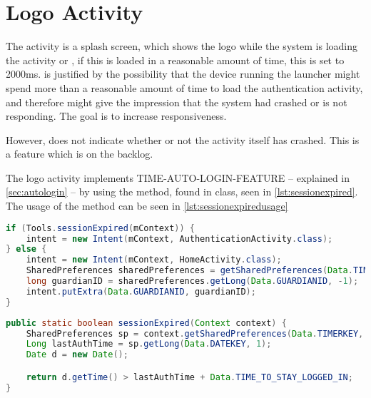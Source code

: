 \section{Logo Activity}
The  activity is a splash screen, which shows the \giraf[] logo while the system is loading the activity  or , if this is loaded in a reasonable amount of time, this is set to 2000ms.  is justified by the possibility that the device running the launcher might spend more than a reasonable amount of time to load the authentication activity, and therefore might give the impression that the system had crashed or is not responding. The goal is to increase responsiveness. 


However,  does not indicate whether or not the activity itself has crashed. This is a feature which is on the backlog. 

The logo activity implements TIME-AUTO-LOGIN-FEATURE -- explained in \autoref{sec:autologin} -- by using the  method, found in  class, seen in \autoref{lst:sessionexpired}.
The usage of the  method can be seen in \autoref{lst:sessionexpiredusage}

\begin{lstlisting}[style=sourceCode, language=JAVA, caption=Snippet of: LogoActivity.java, label=lst:sessionexpiredusage] 
if (Tools.sessionExpired(mContext)) {
	intent = new Intent(mContext, AuthenticationActivity.class);
} else {
	intent = new Intent(mContext, HomeActivity.class);
	SharedPreferences sharedPreferences = getSharedPreferences(Data.TIMERKEY, 0);
	long guardianID = sharedPreferences.getLong(Data.GUARDIANID, -1);
	intent.putExtra(Data.GUARDIANID, guardianID);
}
\end{lstlisting}


\begin{lstlisting}[style=sourceCode, language=JAVA, caption=Snippet of: Tools.java, label=lst:sessionexpired]
public static boolean sessionExpired(Context context) {
	SharedPreferences sp = context.getSharedPreferences(Data.TIMERKEY, 0);
	Long lastAuthTime = sp.getLong(Data.DATEKEY, 1);
	Date d = new Date();

	return d.getTime() > lastAuthTime + Data.TIME_TO_STAY_LOGGED_IN;
}
	\end{lstlisting}

